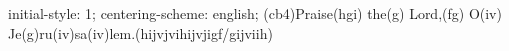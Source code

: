 initial-style: 1;
centering-scheme: english;
(cb4)Praise(hgi) the(g) Lord,(fg) O(iv) Je(g)ru(iv)sa(iv)lem.(hijvjvihijvjigf/gijviih)
